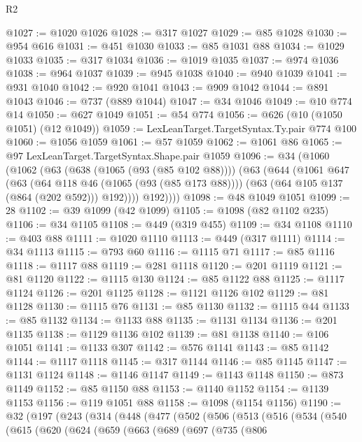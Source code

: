 \begin{lexlean}{R2}
\begin{coremodule}
@1027 := @1020 @1026
@1028 := @317 @1027
@1029 := @85 @1028
@1030 := @954 @616
@1031 := @451 @1030
@1033 := @85 @1031 @88
@1034 := @1029 @1033
@1035 := @317 @1034
@1036 := @1019 @1035
@1037 := @974 @1036
@1038 := @964 @1037
@1039 := @945 @1038
@1040 := @940 @1039
@1041 := @931 @1040
@1042 := @920 @1041
@1043 := @909 @1042
@1044 := @891 @1043
@1046 := @737 (@889 @1044)
@1047 := @34 @1046
@1049 := @10 @774 @14
@1050 := @627 @1049
@1051 := @54 @774
@1056 := @626 (@10 (@1050 @1051) (@12 @1049))
@1059 := LexLeanTarget.TargetSyntax.Ty.pair @774 @100
@1060 := @1056 @1059
@1061 := @57 @1059
@1062 := @1061 @86
@1065 := @97 LexLeanTarget.TargetSyntax.Shape.pair @1059
@1096 := @34
    (@1060
      (@1062
        (@63
          (@638 (@1065 (@93 (@85 @102 @88))))
          (@63
            (@644
              (@1061
                @647
                (@63
                  (@64 @118 @46 (@1065 (@93 (@85 @173 @88))))
                  (@63 (@64 @105 @137 (@864 (@202 @592))) @192))))
            @192))))
@1098 := @48 @1049 @1051
@1099 := 28
@1102 := @39 @1099 (@42 @1099)
@1105 := @1098 (@82 @1102 @235)
@1106 := @34 @1105
@1108 := @449 (@319 @455)
@1109 := @34 @1108
@1110 := @403 @88
@1111 := @1020 @1110
@1113 := @449 (@317 @1111)
@1114 := @34 @1113
@1115 := @793 @60
@1116 := @1115 @71
@1117 := @85 @1116
@1118 := @1117 @88
@1119 := @281 @1118
@1120 := @201 @1119
@1121 := @81 @1120
@1122 := @1115 @130
@1124 := @85 @1122 @88
@1125 := @1117 @1124
@1126 := @201 @1125
@1128 := @1121 @1126 @102
@1129 := @81 @1128
@1130 := @1115 @76
@1131 := @85 @1130
@1132 := @1115 @44
@1133 := @85 @1132
@1134 := @1133 @88
@1135 := @1131 @1134
@1136 := @201 @1135
@1138 := @1129 @1136 @102
@1139 := @81 @1138
@1140 := @106 @1051
@1141 := @1133 @307
@1142 := @576 @1141
@1143 := @85 @1142
@1144 := @1117 @1118
@1145 := @317 @1144
@1146 := @85 @1145
@1147 := @1131 @1124
@1148 := @1146 @1147
@1149 := @1143 @1148
@1150 := @873 @1149
@1152 := @85 @1150 @88
@1153 := @1140 @1152
@1154 := @1139 @1153
@1156 := @119 @1051 @88
@1158 := @1098 (@1154 @1156)
@1190 := @32
    (@197
      (@243
        (@314
          (@448
            (@477
              (@502
                (@506
                  (@513
                    (@516
                      (@534
                        (@540
                          (@615
                            (@620
                              (@624
                                (@659
                                  (@663
                                    (@689
                                      (@697
                                        (@735
                                          (@806

\end{coremodule}
\end{lexlean}
